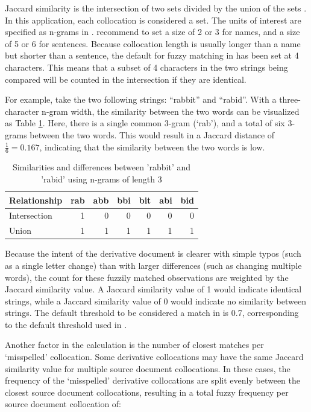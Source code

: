 Jaccard similarity is the intersection of two sets divided by the union of the sets \citep{wu_review_2022}.
In this application, each collocation is considered a set.
The units of interest are specified as n-grams in .
\citet{zoomerjoin} recommend to set a size of 2 or 3 for names, and a size of 5 or 6 for sentences.
Because collocation length is usually longer than a name but shorter than a sentence, the default for fuzzy matching in  has been set at 4 characters.
This means that a subset of 4 characters in the two strings being compared will be counted in the intersection if they are identical.

For example, take the two following strings: ``rabbit'' and ``rabid''.
With a three-character n-gram width, the similarity between the two words can be visualized as Table \ref{tab:jaccard-example}.
Here, there is a single common 3-gram (`rab'), and a total of six 3-grams between the two words.
This would result in a Jaccard distance of \(\frac{1}{6}=0.167\), indicating that the similarity between the two words is low.

\begin{table}[t]
\caption{\label{tab:jaccard-example}Similarities and differences between 'rabbit' and 'rabid' using n-grams of length 3} 
\fontsize{9.0pt}{11.0pt}\selectfont
\begin{tabular*}{\linewidth}{@{\extracolsep{\fill}}lrrrrrr}
\toprule
Relationship & rab & abb & bbi & bit & abi & bid \\ 
\midrule\addlinespace[2.5pt]
Intersection & 1 & 0 & 0 & 0 & 0 & 0 \\ 
Union & 1 & 1 & 1 & 1 & 1 & 1 \\ 
\bottomrule
\end{tabular*}
\end{table}

Because the intent of the derivative document is clearer with simple typos (such as a single letter change) than with larger differences (such as changing multiple words), the count for these fuzzily matched observations are weighted by the Jaccard similarity value.
A Jaccard similarity value of 1 would indicate identical strings, while a Jaccard similarity value of 0 would indicate no similarity between strings.
The default threshold to be considered a match in  is 0.7, corresponding to the default threshold used in  \citep{zoomerjoin}.

Another factor in the calculation is the number of closest matches per `misspelled' collocation.
Some derivative collocations may have the same Jaccard similarity value for multiple source document collocations.
In these cases, the frequency of the `misspelled' derivative collocations are split evenly between the closest source document collocations, resulting in a total fuzzy frequency per source document collocation of:

